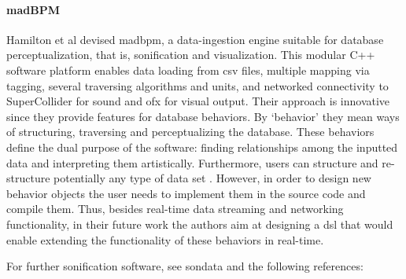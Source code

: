 \paragraph{madBPM}
Hamilton et al \parencite{icmc/bbp2372.2017.087} devised \gls{madbpm}, a data-ingestion engine suitable for database perceptualization, that is, sonification and visualization. This modular C++ software platform enables data loading from \gls{csv} files, multiple mapping via tagging, several traversing algorithms and units, and networked connectivity to SuperCollider for sound and \gls{ofx} for visual output. Their approach is innovative since they provide features for database behaviors. By `behavior' they mean ways of structuring, traversing and perceptualizing the database. These behaviors define the dual purpose of the software: finding relationships among the inputted data and interpreting them artistically. Furthermore, users can structure and re-structure potentially any type of data set \parencite[504]{icmc/bbp2372.2017.087}. However, in order to design new behavior objects the user needs to implement them in the source code and compile them. Thus, besides real-time data streaming and networking functionality, in their future work the authors aim at designing a \gls{dsl} that would enable extending the functionality of these behaviors in real-time.

For further sonification software, see \gls{sondata} and the following references: \parencite{Wil96:Lis, pauletto04, Lod98:MUS, Bei09:Aes, Her14:Aso, DBLP:conf/icad/2007/Worral,DBLP:conf/icad/2003/Walker}

